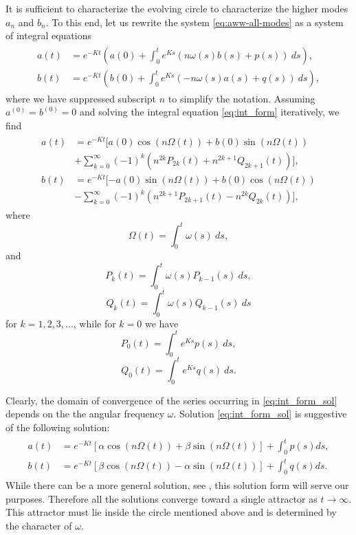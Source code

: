 It is sufficient to characterize the evolving circle to characterize the higher modes $a_n$ and $b_n$. To this end, let us rewrite the system \eqref{eq:aww-all-modes} as a system of integral equations
\begin{gather}
\begin{aligned} \label{eq:int_form}
a(t) &= e^{-Kt} \left( a(0) + \int_0^t e^{Ks}(n\omega(s) b(s) + p(s))~ds \right),\\
b(t) &= e^{-Kt} \left( b(0) + \int_0^t e^{Ks}(-n\omega(s) a(s) + q(s))~ds \right),
\end{aligned}
\end{gather}
where we have suppressed subscript $n$ to simplify the notation. Assuming $a^{(0)} = b^{(0)} =0$ and solving the integral equation \eqref{eq:int_form} iteratively, we find
\begin{gather} \label{eq:int_form_sol}
\begin{aligned}
a(t) &= e^{-Kt} [ a(0) \cos(n\Omega(t)) +b(0)\sin(n \Omega(t)) \\
&+\sum_{k=0}^\infty (-1)^k \left(n^{2k} P_{2k}(t) +n^{2k+1} Q_{2k+1}(t)\right)],\\
b(t) &= e^{-Kt} [ -a(0) \sin(n\Omega(t)) +b(0)\cos(n \Omega(t)) \\
&-\sum_{k=0}^\infty (-1)^k \left(n^{2k+1} P_{2k+1}(t) -n^{2k} Q_{2k}(t)\right)],
\end{aligned}
\end{gather}
where
$$\Omega(t) = \int_0^t \omega(s)~ds, 
$$
and
$$P_k(t) = \int_0^t \omega(s) P_{k-1}(s)~ds, 
$$
$$Q_k(t) = \int_0^t \omega(s) Q_{k-1}(s)~ds$$
for $k = 1,2,3,...$, while for $k=0$ we have
$$P_0(t) = \int_0^t e^{Ks} p(s)~ds,
$$
$$Q_0(t) = \int_0^t e^{Ks} q(s)~ds.$$

Clearly, the domain of convergence of the series occurring in \eqref{eq:int_form_sol} depends on the the angular frequency $\omega$. Solution \eqref{eq:int_form_sol} is suggestive of the following solution:
\begin{gather} \label{eq:int_form_sol2}
\begin{aligned}
a(t) &= e^{-Kt} [ \alpha \cos(n\Omega(t)) +\beta \sin(n \Omega(t))] +\int_0^t p(s)ds,\\
b(t) &= e^{-Kt} [ \beta \cos(n \Omega(t)) -\alpha \sin(n\Omega(t))] +\int_0^t q(s)ds.
\end{aligned}
\end{gather}
While there can be a more general solution, see \cite{KG92}, this solution form will serve our purposes. Therefore all the solutions converge toward a single attractor as $t \to \infty$. This attractor must lie inside the circle mentioned above and is determined by the character of $\omega$.

